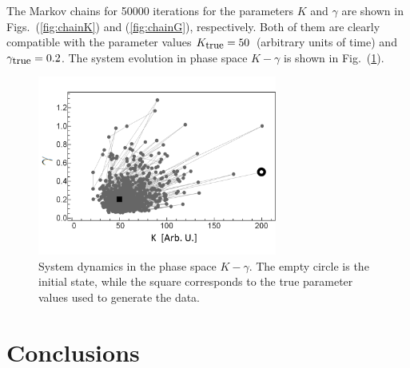 \documentclass[12pt,a4paper,final]{iopart}
\begin{document}
The Markov chains for 50000 iterations for the parameters $K$ and $\gamma$ are shown in Figs.~(\ref{fig:chainK}) and (\ref{fig:chainG}), respectively. Both of them are clearly compatible with the parameter values $K_{\mbox{\small true}} = 50$~(arbitrary units of time) and $\gamma_{\mbox{\small true}} = 0.2$. The system evolution in phase space $K-\gamma$ is shown in Fig.~(\ref{fig:phase_space_evol}). 



\begin{figure}[htb!]
    \centering
    \includegraphics[width=0.7\textwidth]{Figs/FigPhaseSpaceEvol.png}
    \caption{System dynamics in the phase space $K-\gamma$. The empty circle is the initial state, while the square corresponds to the true parameter values used to generate the data.}
    \label{fig:phase_space_evol}
\end{figure}


\section{Conclusions}
\end{document}
